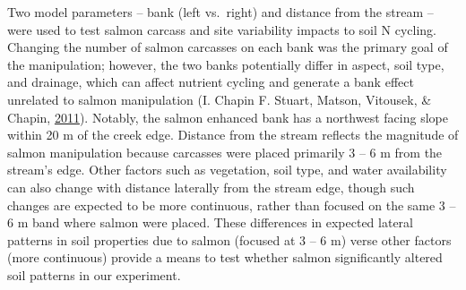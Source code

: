 \documentclass [11pt, proquest] {uwthesis}[2015/03/03]
\begin{document}
Two model parameters -- bank (left vs.~right) and distance from the
stream -- were used to test salmon carcass and site variability impacts
to soil N cycling. Changing the number of salmon carcasses on each bank
was the primary goal of the manipulation; however, the two banks
potentially differ in aspect, soil type, and drainage, which can affect
nutrient cycling and generate a bank effect unrelated to salmon
manipulation (I. Chapin F. Stuart, Matson, Vitousek, \& Chapin,
\protect\hyperlink{ref-Chapin2011}{2011}). Notably, the salmon enhanced
bank has a northwest facing slope within 20 m of the creek edge.
Distance from the stream reflects the magnitude of salmon manipulation
because carcasses were placed primarily 3 -- 6 m from the stream's edge.
Other factors such as vegetation, soil type, and water availability can
also change with distance laterally from the stream edge, though such
changes are expected to be more continuous, rather than focused on the
same 3 -- 6 m band where salmon were placed. These differences in
expected lateral patterns in soil properties due to salmon (focused at 3
-- 6 m) verse other factors (more continuous) provide a means to test
whether salmon significantly altered soil patterns in our experiment.
\end{document}
